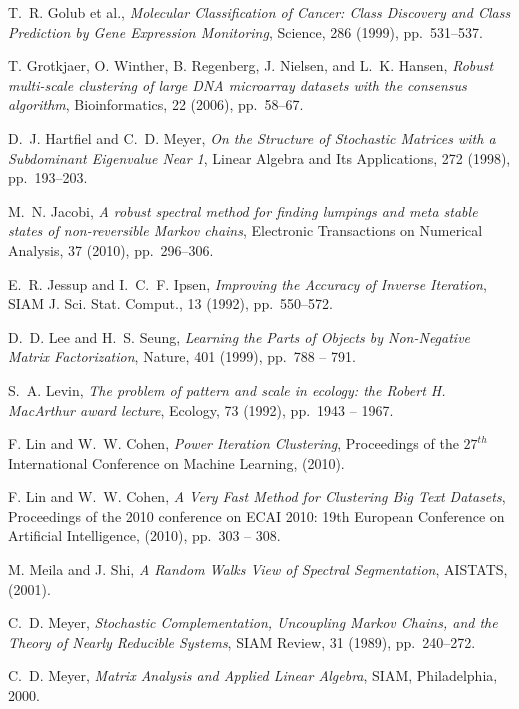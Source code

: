 \documentclass[final]{siamltex}
\begin{document}
\begin{thebibliography}{99}
 {\sc T.~R. Golub et al.}, {\em Molecular Classification of Cancer: Class Discovery and Class Prediction by Gene Expression Monitoring}, Science, 286 (1999), pp.~531--537.

 {\sc T. Grotkjaer, O. Winther, B. Regenberg, J. Nielsen, and L.~K. Hansen}, {\em Robust multi-scale clustering of large DNA microarray datasets with the consensus algorithm}, Bioinformatics, 22 (2006), pp.~58--67.

 {\sc D.~J. Hartfiel and C.~D. Meyer}, {\em On the Structure of Stochastic Matrices with a Subdominant Eigenvalue Near 1}, Linear Algebra and Its Applications, 272 (1998),
pp.~193--203.

 {\sc M.~N. Jacobi}, {\em A robust spectral method for finding lumpings and meta stable states of non-reversible Markov chains}, Electronic Transactions on Numerical Analysis, 37 (2010), pp.~296--306.

 {\sc E.~R. Jessup and I.~C.~F. Ipsen}, {\em Improving the Accuracy of Inverse Iteration}, SIAM J. Sci. Stat. Comput., 13 (1992), pp.~550--572. 

 {\sc D.~D. Lee and H.~S. Seung}, {\em Learning the Parts of Objects by Non-Negative Matrix Factorization}, Nature, 401 (1999), pp.~788 -- 791.

 {\sc S.~A. Levin}, {\em The problem of pattern and scale in ecology: the Robert H. MacArthur award lecture}, Ecology, 73 (1992), pp.~1943 -- 1967.

 {\sc F. Lin and W.~W. Cohen}, {\em Power Iteration Clustering}, Proceedings of the $27^{th}$ International Conference on Machine Learning, (2010).
  
  {\sc F. Lin and W.~W. Cohen}, {\em A Very Fast Method for Clustering Big Text Datasets}, Proceedings of the 2010 conference on ECAI 2010: 19th European Conference on Artificial Intelligence, (2010), pp.~303 -- 308.
 
 {\sc M. Meila and J. Shi}, {\em A Random Walks View of Spectral Segmentation}, AISTATS, (2001).

 {\sc C.~D. Meyer}, {\em Stochastic Complementation, Uncoupling Markov Chains, and the Theory of Nearly Reducible Systems}, SIAM Review, 31 (1989), pp.~240--272.

 {\sc C.~D. Meyer}, {\em Matrix Analysis and Applied Linear Algebra}, SIAM, Philadelphia, 2000.


\end{thebibliography}
\end{document}
